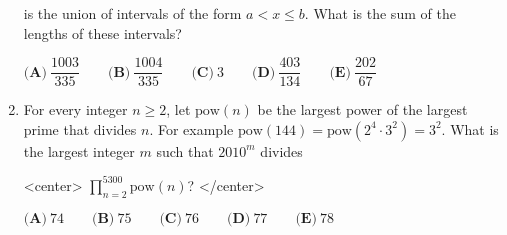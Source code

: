 \documentclass{article}
\begin{document}
\begin{enumerate}[label=\arabic*., itemsep=0.5em]
is the union of intervals of the form $a<x\le b$. What is the sum of the lengths of these intervals?

$\textbf{(A)}\ \dfrac{1003}{335} \qquad \textbf{(B)}\ \dfrac{1004}{335} \qquad \textbf{(C)}\ 3 \qquad \textbf{(D)}\ \dfrac{403}{134} \qquad \textbf{(E)}\ \dfrac{202}{67}$\par \vspace{0.5em}\item For every integer $n\ge2$, let $\text{pow}(n)$ be the largest power of the largest prime that divides $n$. For example $\text{pow}(144)=\text{pow}(2^4\cdot3^2)=3^2$. What is the largest integer $m$ such that $2010^m$ divides

<center>
$\prod_{n=2}^{5300}\text{pow}(n)$?
</center>


$\textbf{(A)}\ 74 \qquad \textbf{(B)}\ 75 \qquad \textbf{(C)}\ 76 \qquad \textbf{(D)}\ 77 \qquad \textbf{(E)}\ 78$\par \vspace{0.5em}\end{enumerate}
\end{document}
